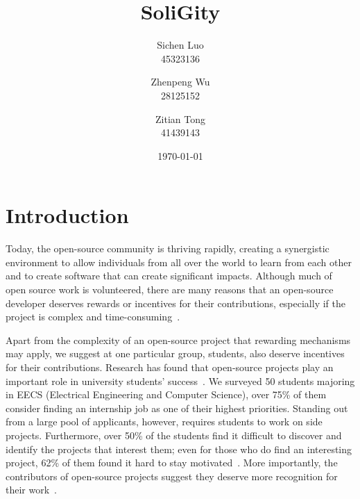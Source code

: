 \documentclass[12pt]{article}
\title{SoliGity}
\author{  
  Sichen Luo\\
  45323136
  \and
  Zhenpeng Wu\\
  28125152 
  \and
  Zitian Tong\\
  41439143
}
\date{\today}
\renewcommand{\_}{\kern-1.5pt\textunderscore\kern-1.5pt}
\begin{document}
\maketitle

\section{Introduction}

Today, the open-source community is thriving rapidly, creating a synergistic environment to allow individuals
from all over the world to learn from each other and to create software that can create significant impacts.
Although much of open source work is volunteered, there are many reasons that an open-source developer deserves
rewards or incentives for their contributions, especially if the project is complex and time-consuming~\cite{community_collaboration}.

Apart from the complexity of an open-source project that rewarding mechanisms may apply, we suggest at one
particular group, students, also deserve incentives for their contributions. Research has found that open-source
projects play an important role in university students’ success~\cite{open_source_guides}. We surveyed 50
students majoring in EECS (Electrical Engineering and Computer Science), over 75\% of them consider finding
an internship job as one of their highest priorities. Standing out from a large pool of applicants, however,
requires students to work on side projects. Furthermore, over 50\% of the students find it difficult to discover
and identify the projects that interest them; even for those who do find an interesting project, 62\% of them
found it hard to stay motivated~\cite{thomas_toch_2014}. More importantly, the contributors of open-source
projects suggest they deserve more recognition for their work~\cite{freecodecamp.org_2018}.
\end{document}
